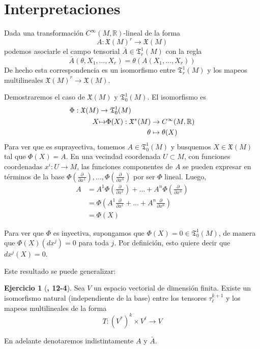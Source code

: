 \documentclass[spanish]{book}
\theoremstyle{definition}
\newtheorem*{ejer*}{Ejercicio}
\newcommand{\R}{\mathbb{R}}
\newcommand{\X}{\mathfrak{X}}
\newcommand{\T}{\mathfrak{T}}
\newcommand{\Cinf}{C^\infty}
\begin{document}
	\section{Interpretaciones}
	Dada una transformación $\Cinf(M,\R)$-lineal de la forma
	\[A:\X(M)^r\to\X(M)\]
	podemos asociarle el campo tensorial $\bar{A}\in\T^1_r(M)$ con la regla
	\[\bar{A}(\theta,X_1,\ldots,X_r)=\theta(A(X_1,\ldots,X_r))\]
	De hecho esta correspondencia es un isomorfismo entre $\T^1_r(M)$ y los mapeos multilineales $\X(M)^r\to\X(M)$.
	
	Demostraremos el caso de $\X(M)$ y $\T^1_0(M)$. El isomorfismo es
	\begin{align*}
		\Phi:\X(M)&\to\T^1_0(M)\\
		\begin{aligned}
			X\\\leavevmode
		\end{aligned}&
		\begin{aligned}
			\mapsto\\\leavevmode
		\end{aligned}
		\begin{aligned}
			\Phi(X):\X^*(M)&\to\Cinf(M,\R)\\
			\theta&\mapsto\theta(X)
		\end{aligned}
	\end{align*}
	Para ver que es suprayectiva, tomemos $A\in\T^1_0(M)$ y busquemos $X\in\X(M)$ tal que $\Phi(X)=A$. En una vecindad coordenada $U\subset M$, con funciones coordenadas $x^i:U\to M$, las funciones componentes de $A$ se pueden expresar en términos de la base $\Phi\left(\frac{\partial}{\partial x^1}\right),\ldots,\Phi\left(\frac{\partial}{\partial x^n}\right)$ por ser $\Phi$ lineal. Luego,
	\begin{align*}
		A&=A^1\Phi\left(\frac{\partial}{\partial x^1}\right)+\ldots+A^n\Phi\left(\frac{\partial}{\partial x^n}\right)\\
		&=\Phi\left(A^1\frac{\partial}{\partial x^1}+\ldots+A^n\frac{\partial}{\partial x^n}\right)\\
		&=\Phi(X)
	\end{align*}
	
	Para ver que $\Phi$ es inyectiva, supongamos que $\Phi(X)=0\in\T^1_0(M)$, de manera que $\Phi(X)(dx^j)=0$ para toda $j$. Por definición, esto quiere decir que $dx^j(X)=0$. 
	
	Este resultado se puede generalizar:
	\begin{ejer*}[\cite{Lee}\textbf{, 12-4}]
		Sea $V$ un espacio vectorial de dimensión finita. Existe un isomorfismo natural (independiente de la base) entre los tensores $\tau^{k+1}_\ell$ y los mapeos multilineales de la forma
		\[T:(V^*)^k\times V^\ell\to V\]
	\end{ejer*}
	En adelante denotaremos indistintamente $A$ y $\bar{A}$.
	
\end{document}

